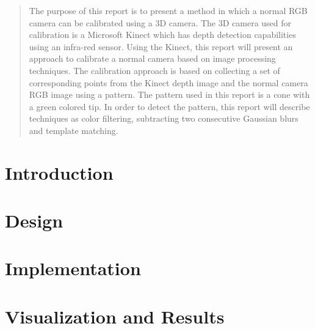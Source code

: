 \documentclass[a4paper,11pt]{report}
\begin{document}
\maketitle

\tableofcontents

\begin{abstract}

The purpose of this report is to present a method in which a normal RGB camera can be calibrated using a 3D camera. The 3D camera used for calibration is a Microsoft Kinect which has depth detection capabilities using an infra-red sensor. Using the Kinect, this report will present an approach to calibrate a normal camera based on image processing techniques. The calibration approach is based on collecting a set of corresponding points from the Kinect depth image and the normal camera RGB image using a pattern. The pattern used in this report is a cone with a green colored tip. In order to detect the pattern, this report will describe techniques as color filtering, subtracting two consecutive Gaussian blurs and template matching. 
\end{abstract}

\chapter{Introduction}


\chapter{Design}


\chapter{Implementation}


\chapter{Visualization and Results}



\end{document}
